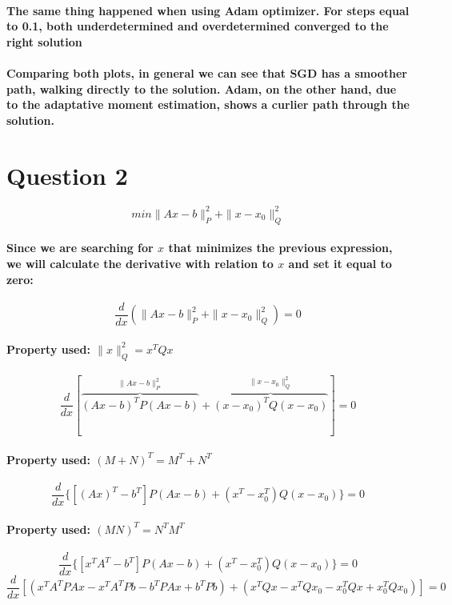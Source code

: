 \documentclass[a4paper]{article}    %
\begin{document}
\paragraph{The same thing happened when using Adam optimizer. For steps equal to 0.1, both underdetermined and overdetermined converged to the right solution}

\paragraph{Comparing both plots, in general we can see that SGD has a smoother path, walking directly to the solution. Adam, on the other hand, due to the adaptative moment estimation, shows a curlier path through the solution.}

\newpage

\section*{Question 2}

\[min\|Ax-b\|_{P}^{2}+\|x-x_{0}\|_{Q}^{2}\]
\paragraph{Since we are searching for $x$ that minimizes the previous expression, we will calculate the derivative with relation to $x$ and set it equal to zero:}
    \[\frac{d}{dx} (\|Ax-b\|_{P}^{2}+\|x-x_{0}\|_{Q}^{2}) = 0\]
\paragraph{Property used: $\|x\|_{Q}^{2} = x^{T}Qx$}
    \[\frac{d}{dx} [\overbrace{(Ax-b)^{T} P (Ax-b)}^{\|Ax-b\|_{P}^{2}} + \overbrace{(x-x_0)^T Q (x-x_0)}^{\|x-x_{0}\|_{Q}^{2}}] = 0\]
\paragraph{Property used: $(M + N)^T = M^T + N^T$}
    \[\frac{d}{dx} \{[(Ax)^T-b^T] P (Ax-b) + (x^T-x_0^T) Q (x-x_0)\} = 0\]
\paragraph{Property used: $(MN)^T = N^T M^T$}
    \[\frac{d}{dx} \{[x^TA^T-b^T] P (Ax-b) + (x^T-x_0^T) Q (x-x_0)\} = 0\]
    \[\frac{d}{dx} [(x^TA^TPAx - x^TA^TPb -b^TPAx + b^TPb) + (x^TQx - x^TQx_0 - x_0^TQx + x_0^TQx_0)] = 0\]
\end{document}
